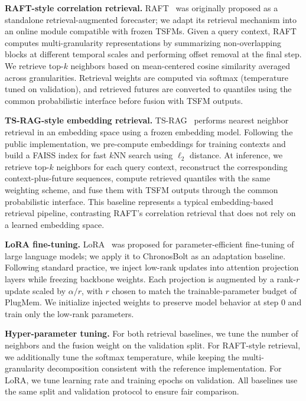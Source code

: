 \noindent\textbf{RAFT-style correlation retrieval.}
RAFT~\cite{han2025retrieval} was originally proposed as a standalone retrieval-augmented forecaster; we adapt its retrieval mechanism into an online module compatible with frozen TSFMs.
Given a query context, RAFT computes multi-granularity representations by summarizing non-overlapping blocks at different temporal scales and performing offset removal at the final step.
We retrieve top-$k$ neighbors based on mean-centered cosine similarity averaged across granularities.
Retrieval weights are computed via softmax (temperature tuned on validation), and retrieved futures are converted to quantiles using the common probabilistic interface before fusion with TSFM outputs.

\noindent\textbf{TS-RAG-style embedding retrieval.}
TS-RAG~\cite{ning2025ts} performs nearest neighbor retrieval in an embedding space using a frozen embedding model.
Following the public implementation, we pre-compute embeddings for training contexts and build a FAISS index for fast $k$NN search using $\ell_2$ distance.
At inference, we retrieve top-$k$ neighbors for each query context, reconstruct the corresponding context-plus-future sequences, compute retrieved quantiles with the same weighting scheme, and fuse them with TSFM outputs through the common probabilistic interface.
This baseline represents a typical embedding-based retrieval pipeline, contrasting RAFT's correlation retrieval that does not rely on a learned embedding space.

\noindent\textbf{LoRA fine-tuning.}
LoRA~\cite{hu2022lora} was proposed for parameter-efficient fine-tuning of large language models; we apply it to ChronosBolt as an adaptation baseline.
Following standard practice, we inject low-rank updates into attention projection layers while freezing backbone weights.
Each projection is augmented by a rank-$r$ update scaled by $\alpha/r$, with $r$ chosen to match the trainable-parameter budget of PlugMem.
We initialize injected weights to preserve model behavior at step 0 and train only the low-rank parameters.

\noindent\textbf{Hyper-parameter tuning.}
For both retrieval baselines, we tune the number of neighbors and the fusion weight on the validation split.
For RAFT-style retrieval, we additionally tune the softmax temperature, while keeping the multi-granularity decomposition consistent with the reference implementation.
For LoRA, we tune learning rate and training epochs on validation.
All baselines use the same split and validation protocol to ensure fair comparison.


